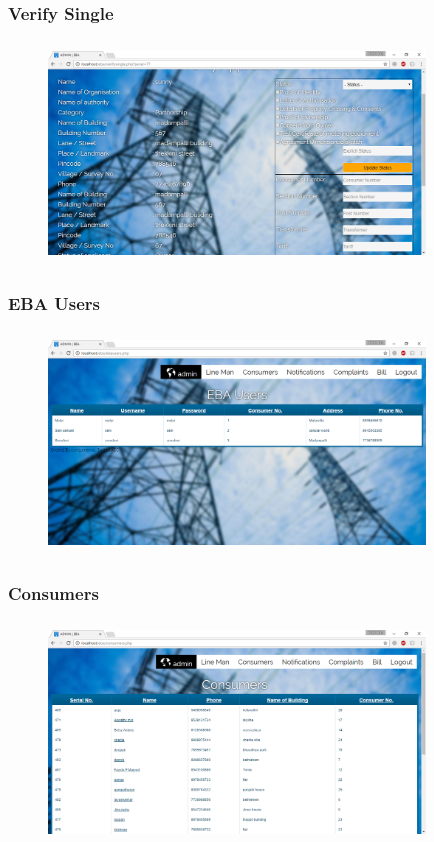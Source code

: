 \documentclass{beamer} %
\theoremstyle{definition} %
\begin{document}
\begin{frame}
\frametitle{Verify Single }
\begin{figure}[center]
\includegraphics[width=10cm ,height=5.9cm]{verifysingle.png} 
\end{figure}
\end{frame}

\begin{frame}
\frametitle{EBA Users}
\begin{figure}[center]
\includegraphics[width=10cm ,height=5.9cm]{ebausers.png} 
\end{figure}
\end{frame}

\begin{frame}
\frametitle{Consumers }
\begin{figure}[center]
\includegraphics[width=10cm ,height=5.9cm]{consumers.png} 
\end{figure}
\end{frame}
\end{document}
